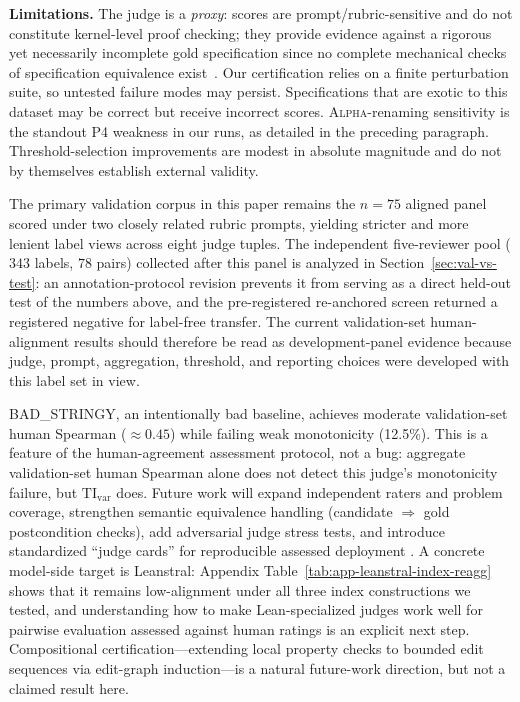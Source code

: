 \documentclass{article}
\begin{document}
\textbf{Limitations.} The judge is a \emph{proxy}: scores are prompt/rubric-sensitive and do not constitute kernel-level proof checking; they provide evidence against a rigorous yet necessarily incomplete gold specification since no complete mechanical checks of specification equivalence exist~\citep{rice1953}.
Our certification relies on a finite perturbation suite, so untested failure modes may persist. Specifications that are exotic to this dataset may be correct but receive incorrect scores.
\textsc{Alpha}-renaming sensitivity is the standout P4 weakness in our runs, as detailed in the preceding paragraph.
Threshold-selection improvements are modest in absolute magnitude and do not by themselves establish external validity.

The primary validation corpus in this paper remains the \(n=75\) aligned panel scored under two closely related rubric prompts, yielding stricter and more lenient label views across eight judge tuples. The independent five-reviewer pool (\(343\) labels, \(78\) pairs) collected after this panel is analyzed in Section~\ref{sec:val-vs-test}: an annotation-protocol revision prevents it from serving as a direct held-out test of the numbers above, and the pre-registered re-anchored screen returned a registered negative for label-free transfer.
The current validation-set human-alignment results should therefore be read as development-panel evidence because judge, prompt, aggregation, threshold, and reporting choices were developed with this label set in view.

BAD\_STRINGY, an intentionally bad baseline, achieves moderate validation-set human Spearman (\(\approx0.45\)) while failing weak monotonicity (12.5\%).
This is a feature of the human-agreement assessment protocol, not a bug: aggregate validation-set human Spearman alone does not detect this judge's monotonicity failure, but \(\mathrm{TI}_{\mathrm{var}}\) does.
Future work will expand independent raters and problem coverage, strengthen semantic equivalence handling (candidate $\Rightarrow$ gold postcondition checks), add adversarial judge stress tests, and introduce standardized ``judge cards'' for reproducible assessed deployment \citep{zhou2025graders}. A concrete model-side target is Leanstral: Appendix Table~\ref{tab:app-leanstral-index-reagg} shows that it remains low-alignment under all three index constructions we tested, and understanding how to make Lean-specialized judges work well for pairwise evaluation assessed against human ratings is an explicit next step.
Compositional certification---extending local property checks to bounded edit sequences via edit-graph induction---is a natural future-work direction, but not a claimed result here.
\end{document}
